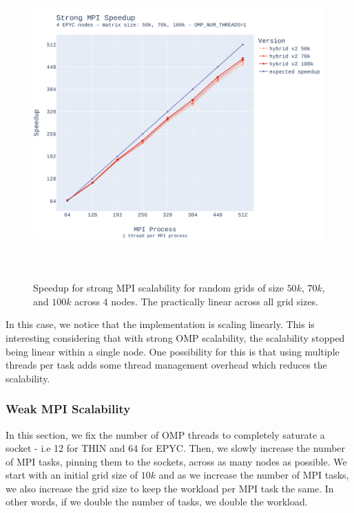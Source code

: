 \documentclass{report}
\begin{document}
\begin{figure}[H]
\centering
\includegraphics[width=14cm, height=12cm]{./images/strong_MPI_epyc_hybrid_grid_100k_speedup.pdf}
\caption{\label{fig:strongmpiepychybridspeedup} Speedup for strong MPI scalability 
for random grids of size $50k$, $70k$, and $100k$ across 4 nodes. The practically 
linear across all grid sizes.}
\end{figure}

In this case, we notice that the implementation is scaling linearly. This is interesting 
considering that with strong OMP scalability, the scalability stopped being linear within 
a single node. One possibility for this is that using multiple threads per task 
adds some thread management overhead which reduces the scalability. 

\subsubsection{Weak MPI Scalability}

In this section, we fix the number of OMP threads to completely saturate a 
socket - i.e 12 for THIN and 64 for EPYC. Then, we slowly increase the number 
of MPI tasks, pinning them to the sockets, across as many nodes as possible. 
We start with an initial grid size of $10k$ and as we increase the number of 
MPI tasks, we also increase the grid size to keep the workload per MPI task 
the same. In other words, if we double the number of tasks, we double the 
workload. 
\end{document}
